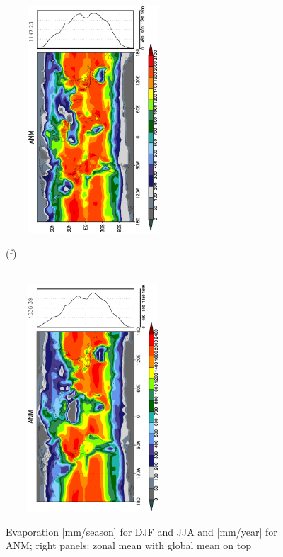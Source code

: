 \documentclass[12pt,a4paper,twoside,openright,headinclude,liststotoc,bibtotoc]{scrreprt}
\begin{document}
\begin{figure}[H]
{\includegraphics[height=8.5cm,width=6.5cm,angle=-90]
{eps/zonaltmevap182.eps}
}
\parbox{8.5cm}{\hspace{0.45cm}\begin{scriptsize}(f)\end{scriptsize} \vspace{-0.7cm} \\
\includegraphics[height=8.5cm,width=6.5cm,angle=-90]
{eps/zonalt21tmevap.eps}
}
\caption[Evaporation]{Evaporation [mm/season] for DJF and JJA and [mm/year] for ANM; right panels: zonal mean with global mean on top}
\label{img:evap}
\end{figure}
\end{document}
